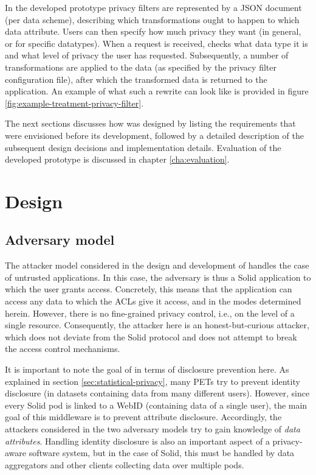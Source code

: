 In the developed prototype privacy filters are represented by a JSON document (per data scheme), describing which transformations ought to happen to which data attribute. Users can then specify how much privacy they want (in general, or for specific datatypes). When a request is received, \middleware{} checks what data type it is and what level of privacy the user has requested. Subsequently, a number of transformations are applied to the data (as specified by the privacy filter configuration file), after which the transformed data is returned to the application. An example of what such a rewrite can look like is provided in figure \ref{fig:example-treatment-privacy-filter}.

The next sections discusses how \middleware{} was designed by listing the requirements that were envisioned before its development, followed by a detailed description of the subsequent design decisions and implementation details. Evaluation of the developed prototype is discussed in chapter \ref{cha:evaluation}.

\section{Design}
\subsection{Adversary model}
\label{sec:attacker-model}
The attacker model considered in the design and development of \middleware{} handles the case of untrusted applications. In this case, the adversary is thus a Solid application to which the user grants access. Concretely, this means that the application can access any data to which the \gls{ACL}s give it access, and in the modes determined herein. However, there is no fine-grained privacy control, i.e., on the level of a single resource. Consequently, the attacker here is an honest-but-curious attacker, which does not deviate from the Solid protocol and does not attempt to break the access control mechanisms.

It is important to note the goal of \middleware{} in terms of disclosure prevention here. As explained in section \ref{sec:statistical-privacy}, many \gls{PETs} try to prevent identity disclosure (in datasets containing data from many different users). However, since every Solid pod is linked to a WebID (containing data of a single user), the main goal of this middleware is to prevent attribute disclosure. Accordingly, the attackers considered in the two adversary models try to gain knowledge of \textit{data attributes}. Handling identity disclosure is also an important aspect of a privacy-aware software system, but in the case of Solid, this must be handled by data aggregators and other clients collecting data over multiple pods.

